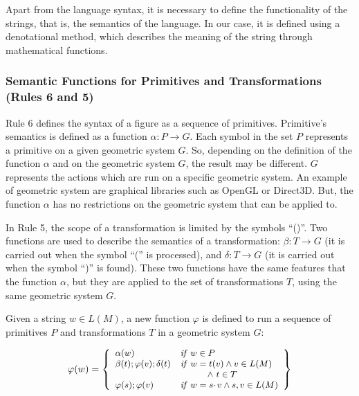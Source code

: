 \documentclass{aamas2012}
\begin{document}
Apart from the language syntax, it is necessary to define the functionality of the strings, that is,
the semantics of the language. In our case, it is defined using a denotational method, which describes
the meaning of the string through mathematical functions.


\subsubsection{Semantic Functions for Primitives and Transformations (Rules 6 and 5)
\label{sec:rule6}}

Rule 6 defines the syntax of a figure as a sequence of primitives. Primitive's semantics is defined
as a function $\alpha: P \rightarrow G$. Each symbol in the set $P$ represents a primitive on a given geometric
system $G$. So, depending on the definition of the function $\alpha$ and on the geometric system $G$, the result
may be different. $G$ represents the actions which are run on a specific geometric system. An example
of geometric system are graphical libraries such as OpenGL or Direct3D. But, the function $\alpha$ has no
restrictions on the geometric system that can be applied to.

In Rule 5, the scope of a transformation is
limited by the symbols ``()''. Two functions are used to describe the semantics
of a transformation: $\beta: T \rightarrow G$ (it is carried out when the symbol ``('' is
processed), and $\delta: T \rightarrow G$ (it is carried out when the symbol ``)'' is found).
These two functions have the same features that the function $\alpha$, but they
are applied to the set of transformations $T$, using the same geometric system
$G$.

Given a string $w \in L(M)$, a new function $\varphi$ is defined to run a sequence of primitives $P$
and transformations $T$ in a geometric system $G$:


\begin{equation}
\begin{small}
    \varphi (w)=\left\{
    \begin{array}{ll}
        \alpha(w) & \mathit{if}  \ w \in P  \\

        \beta(t); \varphi(v); \delta(t) & \mathit{if} \  w = t(v) \wedge v \in L(M) \\
        & \ \ \ \ \ \ \ \ \ \wedge \ t \in T \\

        \varphi(s); \varphi(v)  & \mathit{if} \  w = s \cdotp v \wedge s, v \in L(M)
    \end{array}\right\}
\end{small}
\end{equation}
\end{document}
